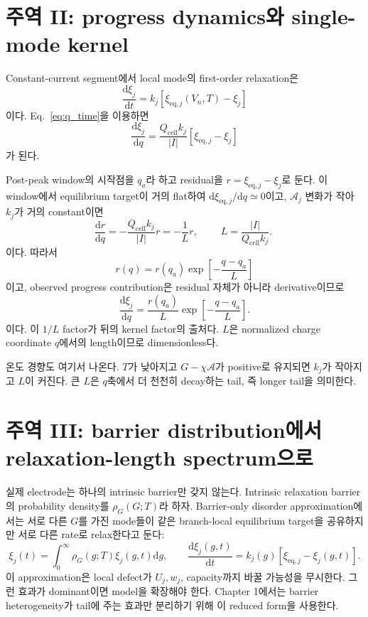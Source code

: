 \documentclass[11pt,a4paper]{article}
\newcommand{\dd}{\mathrm{d}}
\newcommand{\eq}{\mathrm{eq}}
\newcommand{\cell}{\mathrm{cell}}
\begin{document}
\section{주역 II: progress dynamics와 single-mode kernel}\label{sec:dyn}
Constant-current segment에서 local mode의 first-order relaxation은
\begin{equation}
\frac{\dd\xi_j}{\dd t}=k_j[\xi_{\eq,j}(V_n,T)-\xi_j]
\label{eq:dxidt}
\end{equation}
이다. Eq.~\eqref{eq:q_time}을 이용하면
\begin{equation}
\frac{\dd\xi_j}{\dd q}=\frac{Q_{\cell}k_j}{|I|}[\xi_{\eq,j}-\xi_j]
\label{eq:dxidq}
\end{equation}
가 된다.

Post-peak window의 시작점을 $q_a$라 하고 residual을 $r=\xi_{\eq,j}-\xi_j$로 둔다. 이 window에서 equilibrium target이 거의
flat하여 $\dd\xi_{\eq,j}/\dd q\simeq0$이고, $\mathcal A_j$ 변화가 작아 $k_j$가 거의 constant이면
\begin{equation}
\frac{\dd r}{\dd q}=-\frac{Q_{\cell}k_j}{|I|}r=-\frac{1}{L}r,
\qquad
\boxed{\;L=\frac{|I|}{Q_{\cell}k_j}.\;}
\label{eq:Ldef}
\end{equation}
이다. 따라서
\begin{equation}
r(q)=r(q_a)\exp\left[-\frac{q-q_a}{L}\right]
\label{eq:residual_decay}
\end{equation}
이고, observed progress contribution은 residual 자체가 아니라 derivative이므로
\begin{equation}
\boxed{\;\frac{\dd\xi_j}{\dd q}=\frac{r(q_a)}{L}\exp\left[-\frac{q-q_a}{L}\right].\;}
\label{eq:single_dxidq}
\end{equation}
이다. 이 $1/L$ factor가 뒤의 kernel factor의 출처다. $L$은 normalized charge coordinate $q$에서의 length이므로 dimensionless다.

온도 경향도 여기서 나온다. $T$가 낮아지고 $G-\chi\mathcal A$가 positive로 유지되면 $k_j$가 작아지고 $L$이 커진다.
큰 $L$은 $q$축에서 더 천천히 decay하는 tail, 즉 longer tail을 의미한다.

\section{주역 III: barrier distribution에서 relaxation-length spectrum으로}\label{sec:spectrum}
실제 electrode는 하나의 intrinsic barrier만 갖지 않는다. Intrinsic relaxation barrier의 probability density를
$\rho_G(G;T)$라 하자. Barrier-only disorder approximation에서는 서로 다른 $G$를 가진 mode들이 같은 branch-local
equilibrium target을 공유하지만 서로 다른 rate로 relax한다고 둔다:
\begin{equation}
\xi_j(t)=\int_0^\infty \rho_G(g;T)\xi_j(g,t)\dd g,
\qquad
\frac{\dd\xi_j(g,t)}{\dd t}=k_j(g)[\xi_{\eq,j}-\xi_j(g,t)].
\label{eq:xi_dist}
\end{equation}
이 approximation은 local defect가 $U_j,w_j$, capacity까지 바꿀 가능성을 무시한다. 그런 효과가 dominant이면 model을 확장해야 한다.
Chapter 1에서는 barrier heterogeneity가 tail에 주는 효과만 분리하기 위해 이 reduced form을 사용한다.
\end{document}
